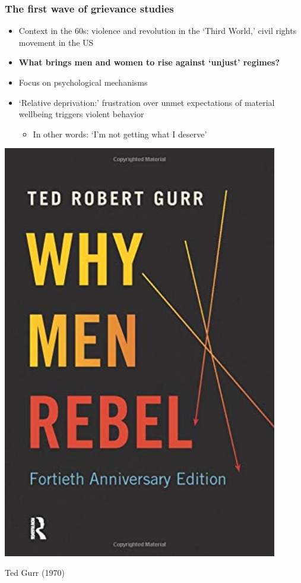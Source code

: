 \documentclass[aspectratio=43]{beamer}
\begin{document}
\begin{frame}
\frametitle{The first wave of grievance studies}
\centering

\begin{minipage}{0.59\textwidth}\centering
\begin{itemize}
  \item Context in the 60s: violence and revolution in the `Third World,' civil rights movement in the US
  \item \textbf{What brings men and women to rise against `unjust' regimes?}
  \item<2-> Focus on psychological mechanisms
  \item<2-> `Relative deprivation:' frustration over unmet expectations of material wellbeing triggers violent behavior
  \begin{itemize}
    \item In other words: `I'm not getting what I deserve'
  \end{itemize}
\end{itemize}
\end{minipage}\hfill
\begin{minipage}{0.4\textwidth}\centering
\includegraphics[width = 0.9\textwidth]{img/why_men_rebel}

Ted Gurr (1970)
\end{minipage}

\end{frame}
\end{document}
